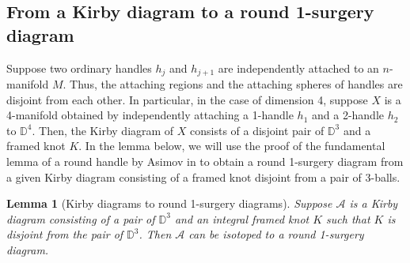 \documentclass{amsart}
\theoremstyle{plain}
\newtheorem{lem}{Lemma}
\theoremstyle{remark}
\theoremstyle{definition}
\newcommand{\D}{\mathbb{D}}
\begin{document}
\subsection{From a Kirby diagram to a round 1-surgery diagram}
Suppose two ordinary handles $h_j$ and $h_{j+1}$ are independently attached to an $n$-manifold $M$.
Thus, the attaching regions and the attaching spheres of handles are disjoint from each other. 
In particular, in the case of dimension 4, suppose $X$ is a 4-manifold obtained by independently attaching a 1-handle $h_1$ and a 2-handle $h_2$ to $\D^4$. 
Then, the Kirby diagram of $X$ consists of a disjoint pair of $\D^3$ and a framed knot $K$.
In the lemma below, we will use the proof of the fundamental lemma of a round handle by Asimov in \cite{Asimov} to obtain a round 1-surgery diagram from a given Kirby diagram consisting of a framed knot disjoint from a pair of 3-balls.   

\begin{lem}[{Kirby diagrams to round 1-surgery diagrams}]\label{Lem: OSDtoR1SD}
    Suppose $\mathcal{A}$ is a Kirby diagram consisting of a pair of $\D^3$ and an integral framed knot $K$ such that $K$ is disjoint from the pair of $\D^3$. 
    Then $\mathcal{A}$ can be isotoped to a round 1-surgery diagram. 
\end{lem}
\end{document}
